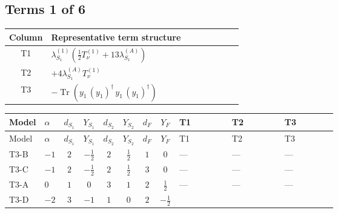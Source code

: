 \documentclass[8pt]{article}
\begin{document}
\begin{landscape}
\subsection*{Terms 1 of 6}
\begin{center}
\begin{tabular}{@{}c >{\raggedright\arraybackslash}p{0.82\linewidth}@{}}
\toprule
Column & Representative term structure \\
\midrule
T1 & \(\displaystyle {\lambda_{S_1}^{(1)}} \left(\frac{1}{2} T_{\nu}^{(1)}+13 {\lambda_{S_1}^{(A)}}\right)\) \\
\midrule
T2 & \(\displaystyle +4 {\lambda_{S_1}^{(A)}} T_{\nu}^{(1)}\) \\
\midrule
T3 & \(\displaystyle -\operatorname{Tr}\!\left({y_1}\,\left({y_1}\right)^{\dagger}\,{y_1}\,\left({y_1}\right)^{\dagger}\right)\) \\
\midrule
\bottomrule
\end{tabular}
\end{center}
\smallskip
\tiny
\begin{longtable}{@{}llcccccc >{\raggedright\arraybackslash}p{0.21\linewidth} >{\raggedright\arraybackslash}p{0.21\linewidth} >{\raggedright\arraybackslash}p{0.21\linewidth}@{}}
\toprule
Model & $\alpha$ & $d_{S_1}$ & $Y_{S_1}$ & $d_{S_2}$ & $Y_{S_2}$ & $d_F$ & $Y_F$ & T1 & T2 & T3 \\
\midrule
\endfirsthead
\toprule
Model & $\alpha$ & $d_{S_1}$ & $Y_{S_1}$ & $d_{S_2}$ & $Y_{S_2}$ & $d_F$ & $Y_F$ & T1 & T2 & T3 \\
\midrule
\endhead
T3-B & $-1$ & $2$ & $-\frac{1}{2}$ & $2$ & $\frac{1}{2}$ & $1$ & $0$ & --- & --- & --- \\
\midrule
T3-C & $-1$ & $2$ & $-\frac{1}{2}$ & $2$ & $\frac{1}{2}$ & $3$ & $0$ & --- & --- & --- \\
\midrule
T3-A & $0$ & $1$ & $0$ & $3$ & $1$ & $2$ & $\frac{1}{2}$ & --- & --- & --- \\
\midrule
T3-D & $-2$ & $3$ & $-1$ & $1$ & $0$ & $2$ & $-\frac{1}{2}$ & \scriptsize\adjustbox{max width=\linewidth}{$\begin{gathered} {\lambda_{S_1}^{(1)}} \left(\frac{1}{2} T_{\nu}^{(1)}+13 {\lambda_{S_1}^{(A)}}\right)\end{gathered}$} & \scriptsize\adjustbox{max width=\linewidth}{$\begin{gathered} +4 {\lambda_{S_1}^{(A)}} T_{\nu}^{(1)}\end{gathered}$} & \scriptsize\adjustbox{max width=\linewidth}{$\begin{gathered} -\operatorname{Tr}\!\left({y_1}\,\left({y_1}\right)^{\dagger}\,{y_1}\,\left({y_1}\right)^{\dagger}\right)\end{gathered}$} \\

\end{longtable}
\end{landscape}
\end{document}
